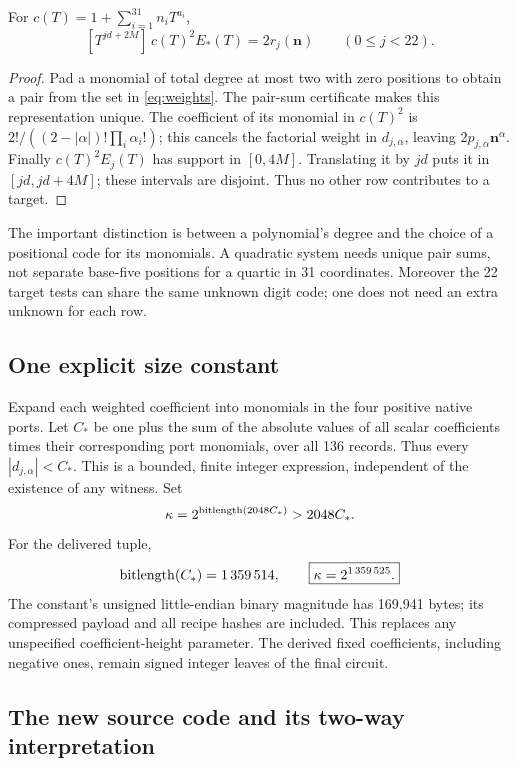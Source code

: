 \begin{lemma}
\label{lem:quadratic-extraction}
For $c(T)=1+\sum_{i=1}^{31}n_iT^{a_i}$,
\[
 [T^{jd+2M}]\,c(T)^2E_*(T)=2r_j(\mathbf n)
 \qquad(0\le j<22).
\]
\end{lemma}
\begin{proof}
Pad a monomial of total degree at most two with zero positions to
obtain a pair from the set in \eqref{eq:weights}. The pair-sum
certificate makes this representation unique. The coefficient of its
monomial in $c(T)^2$ is
$2!/((2-|\alpha|)!\prod_i\alpha_i!)$; this cancels the factorial
weight in $d_{j,\alpha}$, leaving $2p_{j,\alpha}\mathbf n^\alpha$.
Finally $c(T)^2E_j(T)$ has support in $[0,4M]$. Translating it by
$jd$ puts it in $[jd,jd+4M]$; these intervals are disjoint.
Thus no other row contributes to a target.
\end{proof}

The important distinction is between a polynomial's degree and the
choice of a positional code for its monomials. A quadratic system
needs unique pair sums, not separate base-five positions for a quartic
in 31 coordinates. Moreover the 22 target tests can share the same
unknown digit code; one does not need an extra unknown for each row.

\subsection{One explicit size constant}

Expand each weighted coefficient into monomials in the four positive
native ports. Let $C_*$ be one plus the sum of the absolute values of
all scalar coefficients times their corresponding port monomials,
over all 136 records. Thus every $|d_{j,\alpha}|<C_*$.
This is a bounded, finite integer expression, independent of the
existence of any witness. Set
\begin{equation}
 \kappa=2^{\operatorname{bitlength}(2048C_*)}>2048C_*.
 \label{eq:kappa}
\end{equation}
For the delivered tuple,
\[
 \operatorname{bitlength}(C_*)=1\,359\,514,\qquad
 \boxed{\kappa=2^{1\,359\,525}.}
\]
The constant's unsigned little-endian binary magnitude has 169,941
bytes; its compressed payload and all recipe hashes are included.
This replaces any unspecified coefficient-height parameter. The
derived fixed coefficients, including negative ones, remain signed
integer leaves of the final circuit.

\subsection{The new source code and its two-way interpretation}

